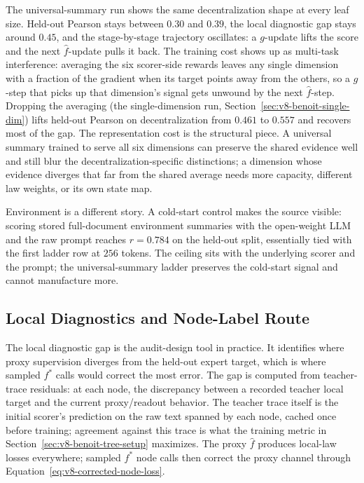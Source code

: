 The universal-summary run shows the same decentralization shape at
every leaf size. Held-out Pearson stays between \(0.30\) and
\(0.39\), the local diagnostic gap stays around \(0.45\), and the
stage-by-stage trajectory oscillates: a \(g\)-update lifts the score
and the next \(\widehat f\)-update pulls it back. The training cost
shows up as multi-task interference: averaging the six scorer-side
rewards leaves any single dimension with a fraction of the gradient
when its target points away from the others, so a \(g\)-step that
picks up that dimension's signal gets unwound by the next
\(\widehat f\)-step. Dropping the averaging (the single-dimension
run, Section~\ref{sec:v8-benoit-single-dim}) lifts held-out Pearson
on decentralization from \(0.461\) to \(0.557\) and recovers most of
the gap. The representation cost is the structural piece. A
universal summary trained to serve all six dimensions can preserve
the shared evidence well and still blur the
decentralization-specific distinctions; a dimension whose evidence
diverges that far from the shared average needs more capacity,
different law weights, or its own state map.

Environment is a different story. A cold-start control makes the
source visible: scoring stored full-document environment summaries
with the open-weight LLM and the raw \citet{BenoitEtAl2025} prompt
reaches \(r=0.784\) on the held-out split, essentially tied with
the first ladder row at \(256\) tokens. The ceiling sits with the
underlying scorer and the prompt; the universal-summary ladder
preserves the cold-start signal and cannot manufacture more.

\subsection{Local Diagnostics and Node-Label Route}
\label{sec:v8-benoit-local-diagnostics}

The local diagnostic gap is the audit-design tool in practice. It
identifies where proxy supervision diverges from the held-out
expert target, which is where sampled \(f^\ast\) calls would
correct the most error. The gap is computed from teacher-trace
residuals: at each node, the discrepancy between a recorded teacher
local target and the current proxy/readout behavior. The teacher
trace itself is the initial scorer's prediction on the raw text
spanned by each node, cached once before training; agreement
against this trace is what the training metric in
Section~\ref{sec:v8-benoit-tree-setup} maximizes. The proxy
\(\widehat f\) produces local-law losses everywhere; sampled
\(f^\ast\) node calls then correct the proxy channel through
Equation~\eqref{eq:v8-corrected-node-loss}.


